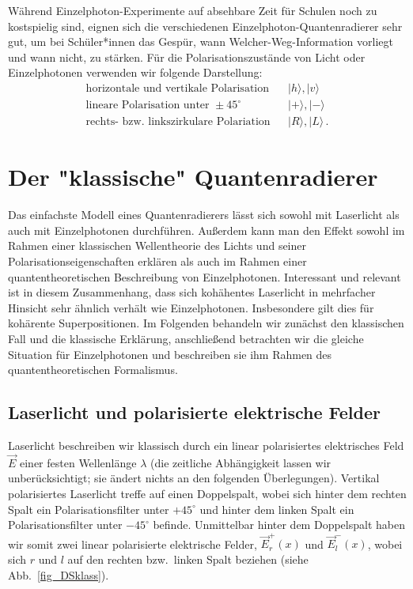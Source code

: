 W\"ahrend Einzelphoton-Experimente auf absehbare Zeit f\"ur Schulen noch zu kostspielig sind,
eignen sich die verschiedenen Einzelphoton-Quantenradierer sehr gut, um bei Sch\"uler*innen
das Gesp\"ur, wann \glqq Welcher-Weg\grqq-Information vorliegt und wann nicht, zu st\"arken.
F\"ur die Polarisationszust\"ande von Licht oder Einzelphotonen verwenden wir folgende
Darstellung:
\begin{eqnarray}
   \mbox{horizontale und vertikale Polarisation} & & |h\rangle , |v \rangle \\
   \mbox{lineare Polarisation unter } \pm 45^\circ & & |+\rangle , | - \rangle \\
   \mbox{rechts- bzw.\ linkszirkulare Polariation} & & |R\rangle , |L \rangle \, .
\end{eqnarray}

\section{Der "klassische" Quantenradierer}

Das einfachste Modell eines Quantenradierers l\"asst sich sowohl mit Laserlicht als auch
mit Einzelphotonen durchf\"uhren. Au\ss erdem kann man den Effekt sowohl im 
Rahmen einer klassischen Wellentheorie
des Lichts und seiner Polarisationseigenschaften erkl\"aren als auch im Rahmen einer
quantentheoretischen Beschreibung von Einzelphotonen. Interessant und relevant ist in diesem
Zusammenhang, dass sich koh\"ahentes Laserlicht in mehrfacher Hinsicht sehr \"ahnlich verh\"alt
wie Einzelphotonen. Insbesondere gilt dies f\"ur koh\"arente Superpositionen.
Im Folgenden behandeln wir zun\"achst den klassischen Fall und die
klassische Erkl\"arung, anschlie\ss end betrachten wir die gleiche Situation f\"ur Einzelphotonen
und beschreiben sie ihm Rahmen des quantentheoretischen Formalismus. 

\subsection{Laserlicht und polarisierte elektrische Felder}

Laserlicht beschreiben wir klassisch durch ein linear polarisiertes elektrisches
Feld $\vec{E}$ einer festen Wellenl\"ange $\lambda$ (die zeitliche Abh\"angigkeit lassen wir
unber\"ucksichtigt; sie \"andert nichts an den folgenden \"Uberlegungen). 
Vertikal polarisiertes Laserlicht treffe auf einen Doppelspalt, wobei
sich hinter dem rechten Spalt ein Polarisationsfilter unter $+45^\circ$ und hinter dem
linken Spalt ein Polarisationsfilter unter $-45^\circ$ befinde. Unmittelbar hinter dem
Doppelspalt haben wir somit zwei linear polarisierte elektrische Felder, $\vec{E}^+_r(x)$ und
$\vec{E}^-_l(x)$, wobei sich $r$ und $l$ auf den rechten bzw.\ linken Spalt 
beziehen (siehe Abb.\ \ref{fig_DSklass}). 

